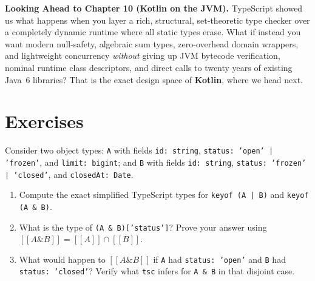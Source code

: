 \begin{connectionbox}
\textbf{Looking Ahead to Chapter 10 (Kotlin on the JVM).} TypeScript showed us what happens when you layer a rich, structural, set-theoretic type checker over a completely dynamic runtime where all static types erase. What if instead you want modern null-safety, algebraic sum types, zero-overhead domain wrappers, and lightweight concurrency \emph{without} giving up JVM bytecode verification, nominal runtime class descriptors, and direct calls to twenty years of existing Java~6 libraries? That is the exact design space of \textbf{Kotlin}, where we head next.
\end{connectionbox}

\section{Exercises}
\label{ch09:exercises}

\begin{exercise}
\label{ex:ch09-set-algebra}
Consider two object types: \texttt{A} with fields \texttt{id: string}, \texttt{status: \allowbreak{}'open' | 'frozen'}, and \texttt{limit: bigint}; and \texttt{B} with fields \texttt{id: string}, \texttt{status: \allowbreak{}'frozen' | 'closed'}, and \texttt{closedAt: Date}.
\begin{enumerate}
  \item Compute the exact simplified TypeScript types for \texttt{keyof (A | B)} and \texttt{keyof (A \& B)}.
  \item What is the type of \texttt{(A \& B)['status']}? Prove your answer using $[\![ A \mathbin{\&} B ]\!] = [\![ A ]\!] \cap [\![ B ]\!]$.
  \item What would happen to $[\![ A \mathbin{\&} B ]\!]$ if \texttt{A} had \texttt{status: 'open'} and \texttt{B} had \texttt{status: 'closed'}? Verify what \texttt{tsc} infers for \texttt{A \& B} in that disjoint case.
\end{enumerate}
\end{exercise}

